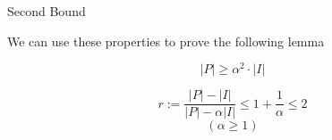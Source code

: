 \begin{frame}{Second Bound}

We can use these properties to prove the following lemma 

\begin{lemma}
$$ |P| \geq \alpha^2 \cdot |I| $$
\end{lemma}

\pause\begin{corollary}
$$ r := \frac{|P| - |I|}{|P| - \alpha |I|} \leq 1 + \frac{1}{\alpha} \leq 2 $$
$$ (\alpha \geq 1)$$
\end{corollary}


\end{frame}

